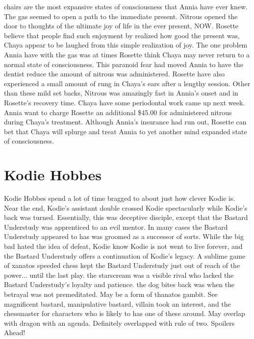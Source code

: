 \documentclass[12pt]{book}
\begin{document}
chairs are the most expansive states of consciousness that Annia have ever knew. The gas seemed to open a path to the immediate present. Nitrous opened the door to thoughts of the ultimate joy of life in the ever present, NOW. Rosette believe that people find such enjoyment by realized how good the present was, Chaya appear to be laughed from this simple realization of joy. The one problem Annia have with the gas was at times Rosette think Chaya may never return to a normal state of consciousness. This paranoid fear had moved Annia to have the dentist reduce the amount of nitrous was administered. Rosette have also experienced a small amount of rung in Chaya's ears after a lengthy session. Other than these mild set backs, Nitrous was amazingly fast in Annia's onset and in Rosette's recovery time. Chaya have some periodontal work came up next week. Annia want to charge Rosette an additional \$45.00 for administered nitrous during Chaya's treatment. Although Annia's insurance had run out, Rosette can bet that Chaya will splurge and treat Annia to yet another mind expanded state of consciousness.



\chapter{Kodie Hobbes}

Kodie Hobbes spend a lot of time bragged to about just how clever Kodie is. Near the end, Kodie's assistant double crossed Kodie spectacularly while Kodie's back was turned. Essentially, this was deceptive disciple, except that the Bastard Understudy was apprenticed to an evil mentor. In many cases the Bastard Understudy appeared to has was groomed as a successor of sorts. While the big bad hated the idea of defeat, Kodie know Kodie is not went to live forever, and the Bastard Understudy offers a continuation of Kodie's legacy. A sublime game of xanatos speeded chess kept the Bastard Understudy just out of reach of the power... until the last play. the starscream was a visible rival who lacked the Bastard Understudy's loyalty and patience. the dog bites back was when the betrayal was not premeditated. May be a form of thanatos gambit. See magnificent bastard, manipulative bastard, villain took an interest, and the chessmaster for characters who is likely to has one of these around. May overlap with dragon with an agenda. Definitely overlapped with rule of two. Spoilers Ahead!
\end{document}
